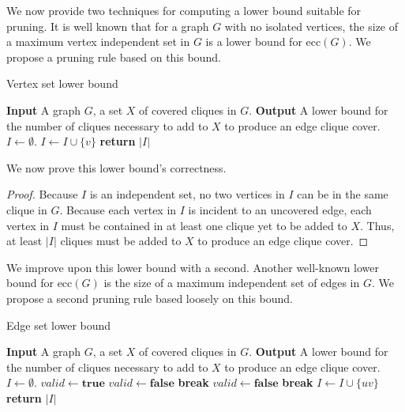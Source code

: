 \documentclass[12pt]{article}
\begin{document}
    We now provide two techniques for computing a lower bound suitable for pruning.
    It is well known that for a graph $G$ with no isolated vertices, the size of a maximum vertex independent set in $G$ is a lower bound for $\text{ecc}(G)$.
    We propose a pruning rule based on this bound.
    \begin{algorithm}
    \caption{Vertex set lower bound}
    \begin{algorithmic}
        \State \textbf{Input} A graph $G$, a set $X$ of covered cliques in $G$.
        \State \textbf{Output} A lower bound for the number of cliques necessary to add to $X$ to produce an edge clique cover.
        \State $I \gets \emptyset$.
                \State $I \gets I \cup \{v\}$
            \EndIf
        \EndFor
        \State \textbf{return} $|I|$
    \end{algorithmic}
    \end{algorithm}

    We now prove this lower bound's correctness.
    \begin{proof}
        Because $I$ is an independent set, no two vertices in $I$ can be in the same clique in $G$.
        Because each vertex in $I$ is incident to an uncovered edge, each vertex in $I$ must be contained in at least one clique yet to be added to $X$.
        Thus, at least $|I|$ cliques must be added to $X$ to produce an edge clique cover.
    \end{proof}

    We improve upon this lower bound with a second.
    Another well-known lower bound for $\text{ecc}(G)$ is the size of a maximum independent set of edges in $G$.
    We propose a second pruning rule based loosely on this bound.
    \begin{algorithm}
    \caption{Edge set lower bound}
    \begin{algorithmic}
        \State \textbf{Input} A graph $G$, a set $X$ of covered cliques in $G$.
        \State \textbf{Output} A lower bound for the number of cliques necessary to add to $X$ to produce an edge clique cover.
        \State $I \gets \emptyset$.
            \State $valid \gets \textbf{true}$
                    \State $valid \gets \textbf{false}$
                    \State \textbf{break}
                \EndIf
                    \State $valid \gets \textbf{false}$
                    \State \textbf{break}
                \EndIf
            \EndFor
                \State $I \gets I \cup \{uv\}$
            \EndIf
        \EndFor
        \State \textbf{return} $|I|$
    \end{algorithmic}
    \end{algorithm}
\end{document}
